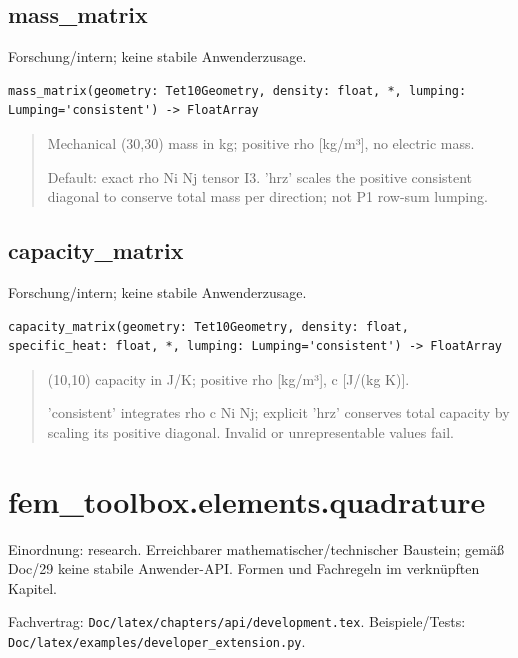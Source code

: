 \subsection{mass\_matrix}
Forschung/intern; keine stabile Anwenderzusage.
\begin{lstlisting}
mass_matrix(geometry: Tet10Geometry, density: float, *, lumping: Lumping='consistent') -> FloatArray
\end{lstlisting}
\begin{quote}
Mechanical (30,30) mass in kg; positive rho [kg/m³], no electric mass.\par Default: exact rho Ni Nj tensor I3. 'hrz' scales the positive consistent diagonal to conserve total mass per direction; not P1 row-sum lumping.
\end{quote}
\subsection{capacity\_matrix}
Forschung/intern; keine stabile Anwenderzusage.
\begin{lstlisting}
capacity_matrix(geometry: Tet10Geometry, density: float, specific_heat: float, *, lumping: Lumping='consistent') -> FloatArray
\end{lstlisting}
\begin{quote}
(10,10) capacity in J/K; positive rho [kg/m³], c [J/(kg K)].\par 'consistent' integrates rho c Ni Nj; explicit 'hrz' conserves total capacity by scaling its positive diagonal. Invalid or unrepresentable values fail.
\end{quote}
\section{fem\_toolbox.elements.quadrature}
Einordnung: research. Erreichbarer mathematischer/technischer Baustein; gemäß Doc/29 keine stabile Anwender-API. Formen und Fachregeln im verknüpften Kapitel.
\par Fachvertrag: \nolinkurl{Doc/latex/chapters/api/development.tex}. Beispiele/Tests:
\nolinkurl{Doc/latex/examples/developer_extension.py}.
